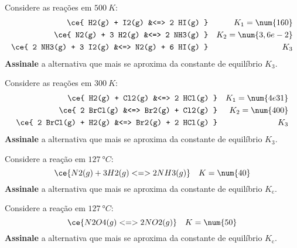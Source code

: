 \begin{problem}[
	id={2F17},
	path={/home/braun/Documents/Developer/braunchem/data/problems/Q2/2F/2F17}
]
Considere as reações em {\(\qty{500}{\unit{K}}\)}: {\[
\begin{aligned}
    \ce{ H2(g) + I2(g) &<=> 2 HI(g) }    && K_1 =
\num{160} \\
    \ce{ N2(g) + 3 H2(g) &<=> 2 NH3(g) } && K_2 =
\num{3,6e-2} \\
    \ce{ 2 NH3(g) + 3 I2(g) &<=> N2(g) + 6 HI(g) } &&
K_3
\end{aligned}
\]} \textbf{Assinale} a alternativa que mais se aproxima da constante de equilíbrio {\(K_3\)}.
\end{problem}


\begin{problem}[
	id={2F18},
	path={/home/braun/Documents/Developer/braunchem/data/problems/Q2/2F/2F18}
]
Considere as reações em {\(\qty{300}{\unit{K}}\)}: {\[
\begin{aligned}
    \ce{ H2(g) + Cl2(g) &<=> 2 HCl(g) }      && K_1 =
\num{4e31} \\
    \ce{ 2 BrCl(g) &<=> Br2(g) + Cl2(g) } && K_2 =
\num{400} \\
    \ce{ 2 BrCl(g) + H2(g) &<=> Br2(g) + 2 HCl(g) } &&
K_3
\end{aligned}
\]} \textbf{Assinale} a alternativa que mais se aproxima da constante de equilíbrio {\(K_3\)}.
\end{problem}


\begin{problem}[
	id={2F19},
	path={/home/braun/Documents/Developer/braunchem/data/problems/Q2/2F/2F19}
]
Considere a reação em {\(\qty{127}{\unit{\degree C}}\)}: {\[
    \ce{ N2(g) + 3 H2(g) <=> 2 NH3(g) } \quad K = \num{40}
\]} \textbf{Assinale} a alternativa que mais se aproxima da constante de equilíbrio {\(K_\mathrm{c}\)}.
\end{problem}


\begin{problem}[
	id={2F20},
	path={/home/braun/Documents/Developer/braunchem/data/problems/Q2/2F/2F20}
]
Considere a reação em {\(\qty{127}{\unit{\degree C}}\)}: {\[
    \ce{ N2O4(g) <=> 2 NO2(g) } \quad K = \num{50}
\]} \textbf{Assinale} a alternativa que mais se aproxima da constante de equilíbrio {\(K_\mathrm{c}\)}.
\end{problem}


